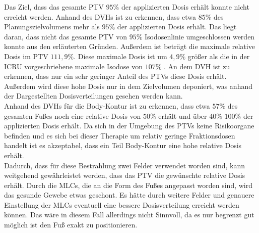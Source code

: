 Das Ziel, dass das gesamte PTV $95\%$ der applizierten Dosis erhält konnte nicht erreicht werden.
Anhand des DVHs ist zu erkennen, dass etwa $85\%$ des Planungszielvolumens mehr als $95\%$ der applizierten Dosis erhält.
Das liegt daran, dass nicht das gesamte PTV von $95\%$ Isodosenlinie umgeschlossen werden konnte aus den erläuterten Gründen.
Außerdem ist beträgt die maximale relative Dosis im PTV $111,9 \%$. Diese maximale Dosis ist um $4,9\%$ größer
als die in der ICRU vorgeschriebene maximale Isodose von $107 \%$ \cite{ICRU}. An dem
DVH ist zu erkennen, dass nur ein sehr geringer Anteil des PTVs diese Dosis erhält.
Außerdem wird diese hohe Dosis nur in dem Zielvolumen deponiert, was anhand der
Dargestellten Dosisverteilungen gesehen werden kann. \\

Anhand des DVHs für die Body-Kontur ist zu erkennen, dass etwa $57\%$ des gesamten Fußes noch eine
relative Dosis von $50\%$ erhält und über $40\%$ $100\%$ der applizierten Dosis erhält.
Da sich in der Umgebung des PTVs keine Risikoorgane befinden und es sich bei dieser
Therapie um relativ geringe Fraktionsdosen handelt ist es akzeptabel, dass
ein Teil Body-Kontur eine hohe relative Dosis erhält. \\

Dadurch, dass für diese Bestrahlung zwei Felder verwendet worden sind, kann
weitgehend gewährleistet werden, dass das PTV die gewünschte relative Dosis erhält.
Durch die MLCs, die an die Form des Fußes angepasst worden sind, wird das gesunde
Gewebe etwas geschont.
Es hätte durch weitere Felder und genauere Einstellung der MLCs eventuell eine bessere Dosisverteilung erreicht
werden können. Das wäre in diesem Fall allerdings nicht Sinnvoll, da es nur
begrenzt gut möglich ist den Fuß exakt zu positionieren.
